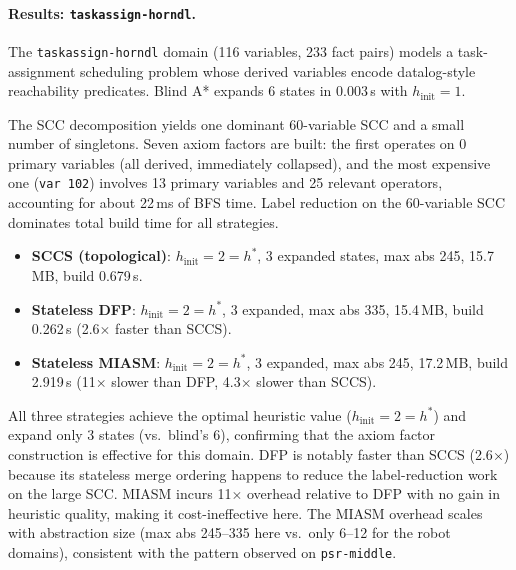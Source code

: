\documentclass[11pt,a4paper]{article}
\begin{document}
    \paragraph{Results: \texttt{taskassign-horndl}.}

    The \texttt{taskassign-horndl} domain (116 variables, 233 fact pairs)
    models a task-assignment scheduling problem whose derived variables
    encode datalog-style reachability predicates.  Blind A* expands 6
    states in 0.003\,s with $h_{\mathrm{init}} = 1$.

    The SCC decomposition yields one dominant 60-variable SCC and a small
    number of singletons.  Seven axiom factors are built: the first
    operates on 0 primary variables (all derived, immediately collapsed),
    and the most expensive one (\texttt{var 102}) involves 13 primary
    variables and 25 relevant operators, accounting for about 22\,ms of
    BFS time.  Label reduction on the 60-variable SCC dominates total
    build time for all strategies.

    \begin{itemize}
      \item \textbf{SCCS (topological)}: $h_{\mathrm{init}} = 2 = h^*$,
            3 expanded states, max abs 245, 15.7\,MB, build 0.679\,s.
      \item \textbf{Stateless DFP}: $h_{\mathrm{init}} = 2 = h^*$,
            3 expanded, max abs 335, 15.4\,MB, build 0.262\,s
            (2.6$\times$ faster than SCCS).
      \item \textbf{Stateless MIASM}: $h_{\mathrm{init}} = 2 = h^*$,
            3 expanded, max abs 245, 17.2\,MB, build 2.919\,s
            (11$\times$ slower than DFP, 4.3$\times$ slower than SCCS).
    \end{itemize}

    All three strategies achieve the optimal heuristic value
    ($h_{\mathrm{init}} = 2 = h^*$) and expand only 3 states (vs.\
    blind's 6), confirming that the axiom factor construction is
    effective for this domain.  DFP is notably faster than SCCS
    (2.6$\times$) because its stateless merge ordering happens to reduce
    the label-reduction work on the large SCC.  MIASM incurs 11$\times$
    overhead relative to DFP with no gain in heuristic quality, making it
    cost-ineffective here.  The MIASM overhead scales with abstraction
    size (max abs 245--335 here vs.\ only 6--12 for the robot domains),
    consistent with the pattern observed on \texttt{psr-middle}.
\end{document}

